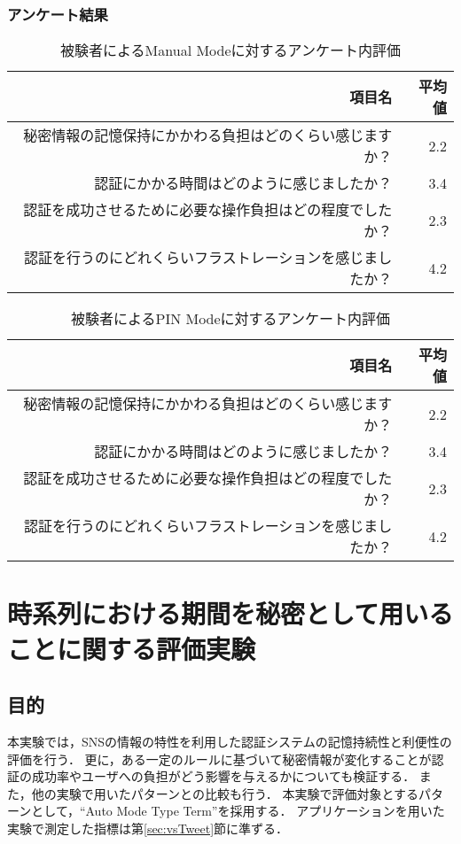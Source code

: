 \subsubsection{アンケート結果}
\begin{table}[ht]
  \begin{center}
    \small
    \begin{tabular}{|r|r|} \hline
      項目名 & 平均値 \\ \hline
      秘密情報の記憶保持にかかわる負担はどのくらい感じますか？ & 2.2 \\
      認証にかかる時間はどのように感じましたか？ & 3.4 \\
      認証を成功させるために必要な操作負担はどの程度でしたか？ & 2.3 \\
      認証を行うのにどれくらいフラストレーションを感じましたか？ & 4.2 \\ \hline
    \end{tabular}
  \end{center}
  \caption{被験者によるManual Modeに対するアンケート内評価}
  \label{tab:manual.enquete}
\end{table}
\begin{table}[ht]
  \begin{center}
    \small
    \begin{tabular}{|r|r|} \hline
      項目名 & 平均値 \\ \hline
      秘密情報の記憶保持にかかわる負担はどのくらい感じますか？ & 2.2 \\
      認証にかかる時間はどのように感じましたか？ & 3.4 \\
      認証を成功させるために必要な操作負担はどの程度でしたか？ & 2.3 \\
      認証を行うのにどれくらいフラストレーションを感じましたか？ & 4.2 \\ \hline
    \end{tabular}
  \end{center}
  \caption{被験者によるPIN Modeに対するアンケート内評価}
  \label{tab:pin.enquete}
\end{table}

\section{時系列における期間を秘密として用いることに関する評価実験}\label{sec:vsTerm}
\subsection{目的}
本実験では，SNSの情報の特性を利用した認証システムの記憶持続性と利便性の評価を行う．
更に，ある一定のルールに基づいて秘密情報が変化することが認証の成功率やユーザへの負担がどう影響を与えるかについても検証する．
また，他の実験で用いたパターンとの比較も行う．
本実験で評価対象とするパターンとして，``Auto Mode Type Term''を採用する．
アプリケーションを用いた実験で測定した指標は第\ref{sec:vsTweet}節に準ずる．

